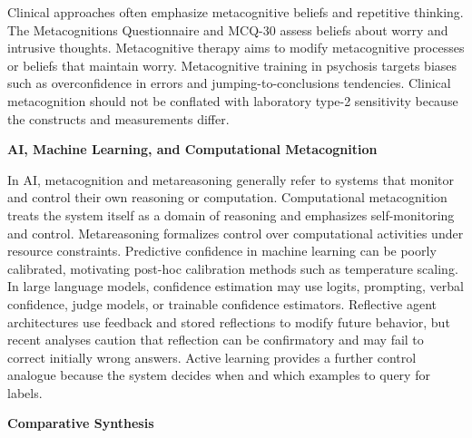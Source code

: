 \documentclass{book}
\providecommand{\ProjectDeepHeading}[2]{%
    \par\medskip\noindent\textbf{#2}\par\smallskip
}
\begin{document}
   Clinical approaches often emphasize metacognitive beliefs and repetitive thinking. The Metacognitions Questionnaire and MCQ-30 assess beliefs about worry and intrusive thoughts. Metacognitive therapy aims to modify metacognitive processes or beliefs that maintain worry. Metacognitive training in psychosis targets biases such as overconfidence in errors and jumping-to-conclusions tendencies. Clinical metacognition should not be conflated with laboratory type-2 sensitivity because the constructs and measurements differ.

   \ProjectDeepHeading{6}{AI, Machine Learning, and Computational Metacognition}

   In AI, metacognition and metareasoning generally refer to systems that monitor and control their own reasoning or computation. Computational metacognition treats the system itself as a domain of reasoning and emphasizes self-monitoring and control. Metareasoning formalizes control over computational activities under resource constraints. Predictive confidence in machine learning can be poorly calibrated, motivating post-hoc calibration methods such as temperature scaling. In large language models, confidence estimation may use logits, prompting, verbal confidence, judge models, or trainable confidence estimators. Reflective agent architectures use feedback and stored reflections to modify future behavior, but recent analyses caution that reflection can be confirmatory and may fail to correct initially wrong answers. Active learning provides a further control analogue because the system decides when and which examples to query for labels.

   \ProjectDeepHeading{5}{Comparative Synthesis}
\end{document}
